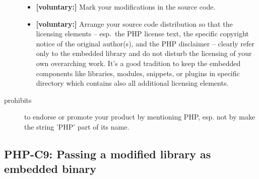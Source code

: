 \begin{description}
\begin{itemize}
  \item \textbf{[voluntary:]} Mark your modifications in the source code.
  
  \item \textbf{[voluntary:]} Arrange your source code distribution so that the
  licensing elements -- esp.\ the PHP license text, the specific copyright
  notice of the original author(s), and the PHP disclaimer -- clearly refer
  only to the embedded library and do not disturb the licensing of your own
  overarching work. It's a good tradition to keep the embedded components like
  libraries, modules, snippets, or plugins in specific directory which contains
  also all additional licensing elements.
  
\end{itemize}

\item[prohibits] to endorse or promote your product by mentioning PHP, esp. not
by make the string 'PHP' part of its name.

\end{description}


\subsection{PHP-C9: Passing a modified library as embedded binary}
\label{OSUC-10B-PHP}

